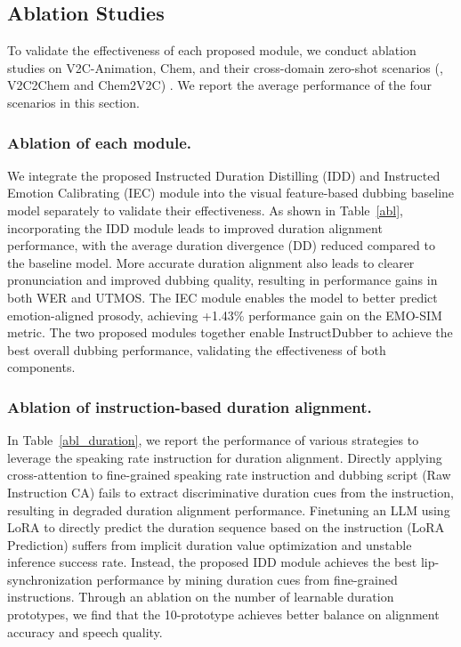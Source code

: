 \subsection{Ablation Studies}
To validate the effectiveness of each proposed module, we conduct ablation studies on V2C-Animation, Chem, and their cross-domain zero-shot scenarios (\ie, V2C2Chem and Chem2V2C)
.
We report the average performance of the four scenarios in this section.

\subsubsection{Ablation of each module.}
We integrate the proposed Instructed Duration Distilling (IDD) and Instructed Emotion Calibrating (IEC) module into the visual feature-based dubbing baseline model separately to validate their effectiveness.
As shown in Table~\ref{abl}, incorporating the IDD module leads to improved duration alignment performance, with the average duration divergence (DD) reduced compared to the baseline model.
More accurate duration alignment also leads to clearer pronunciation and improved dubbing quality, resulting in performance gains in both WER and UTMOS.
The IEC module enables the model to better predict emotion-aligned prosody, achieving +1.43\% performance gain on the EMO-SIM metric.
The two proposed modules together enable InstructDubber to achieve the best overall dubbing performance, validating the effectiveness of both components.




\subsubsection{Ablation of instruction-based duration alignment.}
In Table~\ref{abl_duration}, we report the performance of various strategies to leverage the speaking rate instruction for duration alignment.
Directly applying cross-attention to fine-grained speaking rate instruction and dubbing script (Raw Instruction CA) fails to extract discriminative duration cues from the instruction, resulting in degraded duration alignment performance.
Finetuning an LLM using LoRA to directly predict the duration sequence based on the instruction (LoRA Prediction) suffers from implicit duration value optimization and unstable inference success rate.
Instead, the proposed IDD module achieves the best lip-synchronization performance by mining duration cues from fine-grained instructions.
Through an ablation on the number of learnable duration prototypes, we find that the 10-prototype achieves better balance on alignment accuracy and speech quality.

